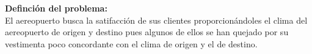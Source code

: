 {\textbf{Definción del problema:}}\\

El aereopuerto busca la satifacción de sus clientes proporcionándoles el clima del aereopuerto de
origen y destino pues algunos de ellos se han quejado por su vestimenta poco concordante con el
clima de origen y el de destino.
